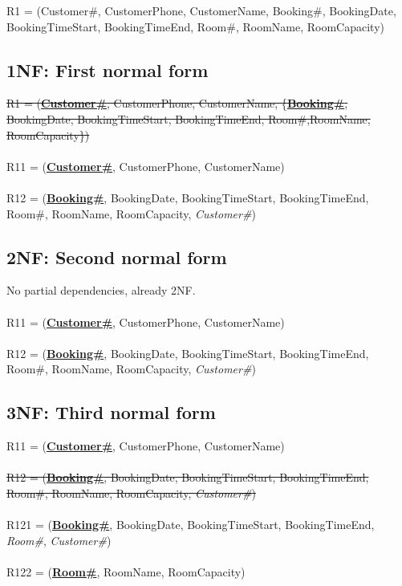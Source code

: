 R1 = (Customer\#, CustomerPhone, CustomerName, {Booking\#, BookingDate, BookingTimeStart, BookingTimeEnd, Room\#, RoomName, RoomCapacity})

\subsection{1NF: First normal form}

\sout{R1 = (\textbf{\underline{Customer\#}}, CustomerPhone, CustomerName, \{\textbf{\underline{Booking\#}}, BookingDate, BookingTimeStart, BookingTimeEnd, Room\#,RoomName, RoomCapacity\})}
\\\\
R11 = (\textbf{\underline{Customer\#}}, CustomerPhone, CustomerName)
\\\\
R12 = (\textbf{\underline{Booking\#}}, BookingDate, BookingTimeStart, BookingTimeEnd, Room\#, RoomName, RoomCapacity, \emph{Customer\#})

\subsection{2NF: Second normal form}

No partial dependencies, already 2NF.
\\\\
R11 = (\textbf{\underline{Customer\#}}, CustomerPhone, CustomerName)
\\\\
R12 = (\textbf{\underline{Booking\#}}, BookingDate, BookingTimeStart, BookingTimeEnd, Room\#, RoomName, RoomCapacity, \emph{Customer\#})

\subsection{3NF: Third normal form}

R11 = (\textbf{\underline{Customer\#}}, CustomerPhone, CustomerName)
\\\\
\sout{R12 = (\textbf{\underline{Booking\#}}, BookingDate, BookingTimeStart, BookingTimeEnd, Room\#, RoomName, RoomCapacity, \emph{Customer\#})}
\\\\
R121 = (\textbf{\underline{Booking\#}}, BookingDate, BookingTimeStart, BookingTimeEnd, \emph{Room\#}, \emph{Customer\#})
\\\\
R122 = (\textbf{\underline{Room\#}}, RoomName, RoomCapacity)

